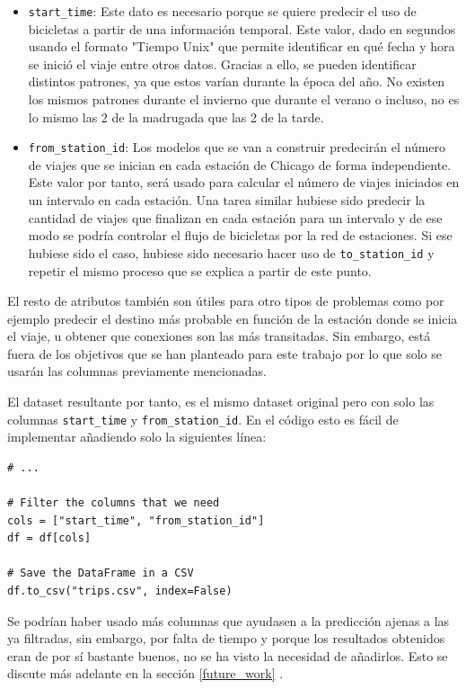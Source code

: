 \begin{itemize}
    \item \small{\verb|start_time|}: Este dato es necesario porque se quiere predecir el uso de bicicletas a partir de una información temporal. Este valor, dado en segundos usando el formato "Tiempo Unix" \cite{unix_time} que permite identificar en qué fecha y hora se inició el viaje entre otros datos. Gracias a ello, se pueden identificar distintos patrones, ya que estos varían durante la época del año. No existen los mismos patrones durante el invierno que durante el verano o incluso, no es lo mismo las 2 de la madrugada que las 2 de la tarde.
    \item \small{\verb|from_station_id|}: Los modelos que se van a construir predecirán el número de viajes que se inician en cada estación de Chicago de forma independiente. Este valor por tanto, será usado para calcular el número de viajes iniciados en un intervalo en cada estación. Una tarea similar hubiese sido predecir la cantidad de viajes que finalizan en cada estación para un intervalo y de ese modo se podría controlar el flujo de bicicletas por la red de estaciones. Si ese hubiese sido el caso, hubiese sido necesario hacer uso de \small{\verb|to_station_id|} y repetir el mismo proceso que se explica a partir de este punto.
\end{itemize}

El resto de atributos también son útiles para otro tipos de problemas como por ejemplo predecir el destino más probable en función de la estación donde se inicia el viaje, u obtener que conexiones son las más transitadas. Sin embargo, está fuera de los objetivos que se han planteado para este trabajo por lo que solo se usarán las columnas previamente mencionadas.
\newline
 
El dataset resultante por tanto, es el mismo dataset original pero con solo las columnas \small{\verb|start_time|} y \small{\verb|from_station_id|}. En el código esto es fácil de implementar añadiendo solo la siguientes línea:
\begin{verbatim}
# ...
    
# Filter the columns that we need
cols = ["start_time", "from_station_id"]
df = df[cols]

# Save the DataFrame in a CSV
df.to_csv("trips.csv", index=False)
\end{verbatim}

Se podrían haber usado más columnas que ayudasen a la predicción ajenas a las ya filtradas, sin embargo, por falta de tiempo y porque los resultados obtenidos eran de por sí bastante buenos, no se ha visto la necesidad de añadirlos. Esto se discute más adelante en la sección \ref{future_work}
.\newline

